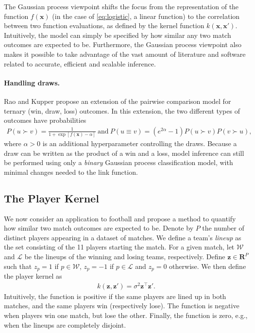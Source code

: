 The Gaussian process viewpoint shifts the focus from the representation of the function $f(\bm{x})$ (in the case of \eqref{eq:logistic}, a linear function) to the correlation between two function evaluations, as defined by the kernel function $k(\bm{x}, \bm{x}')$.
Intuitively, the model can simply be specified by how similar any two match outcomes are expected to be.
Furthermore, the Gaussian process viewpoint also makes it possible to take advantage of the vast amount of literature and software related to accurate, efficient and scalable inference.


\paragraph{Handling draws.}
Rao and Kupper \cite{rao1967ties} propose an extension of the pairwise comparison model for ternary (win, draw, loss) outcomes.
In this extension, the two different types of outcomes have probabilities
\begin{align*}
P(u \succ v) = \frac{1}{1 + \exp[f(\bm{x}) - \alpha]}\ \text{and}\ 
P(u \equiv v) = (e^{2 \alpha} - 1) P(u \succ v) P(v \succ u),
\end{align*}
where $\alpha > 0$ is an additional hyperparameter controlling the draws.
Because a draw can be written as the product of a win and a loss, model inference can still be performed using only a \emph{binary} Gaussian process classification model, with minimal changes needed to the link function.


\subsection{The Player Kernel}

\newcommand{\Wx}{\ensuremath{\mathcal{W}}}
\newcommand{\Lx}{\ensuremath{\mathcal{L}}}
We now consider an application to football and propose a method to quantify how similar two match outcomes are expected to be.
Denote by $P$ the number of distinct players appearing in a dataset of matches.
We define a team's \emph{lineup} as the set consisting of the \num{11} players starting the match.
For a given match, let $\Wx$ and $\Lx$ be the lineups of the winning and losing teams, respectively.
Define $\bm{z} \in \mathbf{R}^P$ such that $z_p = 1$ if $p \in \Wx$, $z_p = -1$ if $p \in \Lx$ and $z_p = 0$ otherwise.
We then define the player kernel as
\begin{align*}
k(\bm{z}, \bm{z}') = \sigma^2 \bm{z}^\top \bm{z}'.
\end{align*}
Intuitively, the function is positive if the same players are lined up in both matches, and the same players win (respectively lose).
The function is negative when players win one match, but lose the other.
Finally, the function is zero, e.g., when the lineups are completely disjoint.

